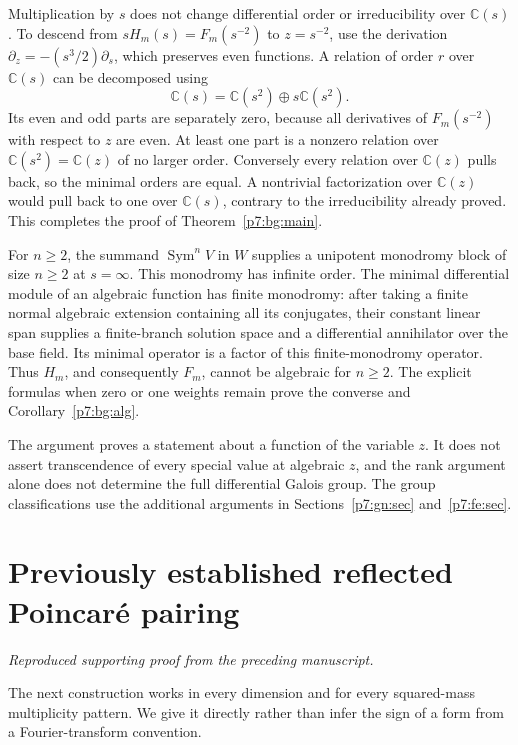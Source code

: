 \documentclass[11pt,a4paper]{article}
\theoremstyle{definition}
\theoremstyle{remark}
\numberwithin{equation}{section}
\begin{document}
Multiplication by $s$ does not change differential order or
irreducibility over $\mathbb C(s)$.  To descend from
$sH_m(s)=F_m(s^{-2})$ to $z=s^{-2}$, use the derivation
$\partial_z=-(s^3/2)\partial_s$, which preserves even functions.
A relation of order $r$ over $\mathbb C(s)$ can be decomposed using
\[
             \mathbb C(s)=\mathbb C(s^2)\oplus s\mathbb C(s^2).
\]
Its even and odd parts are separately zero, because all derivatives
of $F_m(s^{-2})$ with respect to $z$ are even.  At least one part
is a nonzero relation over $\mathbb C(s^2)=\mathbb C(z)$ of no
larger order.  Conversely every relation over $\mathbb C(z)$
pulls back, so the minimal orders are equal.  A nontrivial
factorization over $\mathbb C(z)$ would pull back to one over
$\mathbb C(s)$, contrary to the irreducibility already proved.
This completes the proof of Theorem~\ref{p7:bg:main}.

For $n\ge2$, the summand $\operatorname{Sym}^nV$ in $W$ supplies
a unipotent monodromy block of size $n\ge2$ at $s=\infty$.
This monodromy has infinite order.  The minimal differential
module of an algebraic function has finite monodromy: after taking
a finite normal algebraic extension containing all its conjugates,
their constant linear span supplies a finite-branch solution space
and a differential annihilator over the base field.  Its minimal
operator is a factor of this finite-monodromy operator.
Thus $H_m$, and consequently $F_m$, cannot be algebraic for
$n\ge2$.  The explicit formulas when zero or one weights remain
prove the converse and Corollary~\ref{p7:bg:alg}.

The argument proves a statement about a function of the variable
$z$.  It does not assert transcendence of every special value at
algebraic $z$, and the rank argument alone does not determine the full differential
Galois group. The group classifications use the additional arguments
in Sections~\ref{p7:gn:sec} and~\ref{p7:fe:sec}.


\clearpage

\section{Previously established reflected Poincar\'e pairing}

\noindent\textit{Reproduced supporting proof from the preceding manuscript.}

The next construction works in every dimension and for every
squared-mass multiplicity pattern. We give it directly rather than
infer the sign of a form from a Fourier-transform convention.
\end{document}
